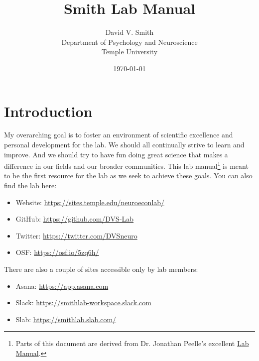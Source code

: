\documentclass[letterpaper,11pt,oneside]{memoir}
\begin{document}
\title{Smith Lab Manual}
\author{David V. Smith\\Department of Psychology and Neuroscience\\Temple University}
\date{\today}


\maketitle

\pagestyle{titlingpage}


\cleardoublepage
\frontmatter
\tableofcontents
\cleardoublepage

\mainmatter

\pagestyle{headings}

\chapter{Introduction}
My overarching goal is to foster an environment of scientific excellence and personal development for the lab. We should all continually strive to learn and improve. And we should try to have fun doing great science that makes a difference in our fields and our broader communities. This lab manual\footnote{Parts of this document are derived from Dr. Jonathan Peelle's excellent \href{https://github.com/jpeelle/peellelab\_manual/}{Lab Manual}.} is meant to be the first resource for the lab as we seek to achieve these goals. You can also find the lab here:

\begin{itemize}[noitemsep]
\item Website: \url{https://sites.temple.edu/neuroeconlab/}
\item GitHub: \url{https://github.com/DVS-Lab}
\item Twitter: \url{https://twitter.com/DVSneuro}
\item OSF: \url{https://osf.io/5zq6h/}
\end{itemize}

\noindent There are also a couple of sites accessible only by lab members:

\begin{itemize}[noitemsep]
\item Asana: \url{https://app.asana.com}
\item Slack: \url{https://smithlab-workspace.slack.com}
\item Slab: \url{https://smithlab.slab.com/}
\end{itemize}
\end{document}
